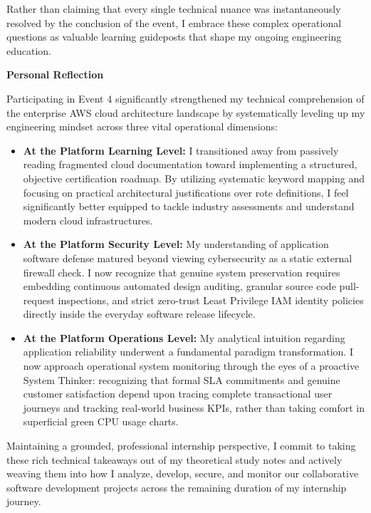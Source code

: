 Rather than claiming that every single technical nuance was
instantaneously resolved by the conclusion of the event, I embrace these
complex operational questions as valuable learning guideposts that shape
my ongoing engineering education.

\vspace{0.5em}\noindent\textbf{Personal Reflection}\par

Participating in Event 4 significantly strengthened my technical
comprehension of the enterprise AWS cloud architecture landscape by
systematically leveling up my engineering mindset across three vital
operational dimensions:

\begin{itemize}
\tightlist
\item
  \textbf{At the Platform Learning Level:} I transitioned away from
  passively reading fragmented cloud documentation toward implementing a
  structured, objective certification roadmap. By utilizing systematic
  keyword mapping and focusing on practical architectural justifications
  over rote definitions, I feel significantly better equipped to tackle
  industry assessments and understand modern cloud infrastructures.
\item
  \textbf{At the Platform Security Level:} My understanding of
  application software defense matured beyond viewing cybersecurity as a
  static external firewall check. I now recognize that genuine system
  preservation requires embedding continuous automated design auditing,
  granular source code pull-request inspections, and strict zero-trust
  Least Privilege IAM identity policies directly inside the everyday
  software release lifecycle.
\item
  \textbf{At the Platform Operations Level:} My analytical intuition
  regarding application reliability underwent a fundamental paradigm
  transformation. I now approach operational system monitoring through
  the eyes of a proactive System Thinker: recognizing that formal SLA
  commitments and genuine customer satisfaction depend upon tracing
  complete transactional user journeys and tracking real-world business
  KPIs, rather than taking comfort in superficial green CPU usage
  charts.
\end{itemize}

Maintaining a grounded, professional internship perspective, I commit to
taking these rich technical takeaways out of my theoretical study notes
and actively weaving them into how I analyze, develop, secure, and
monitor our collaborative software development projects across the
remaining duration of my internship journey.

